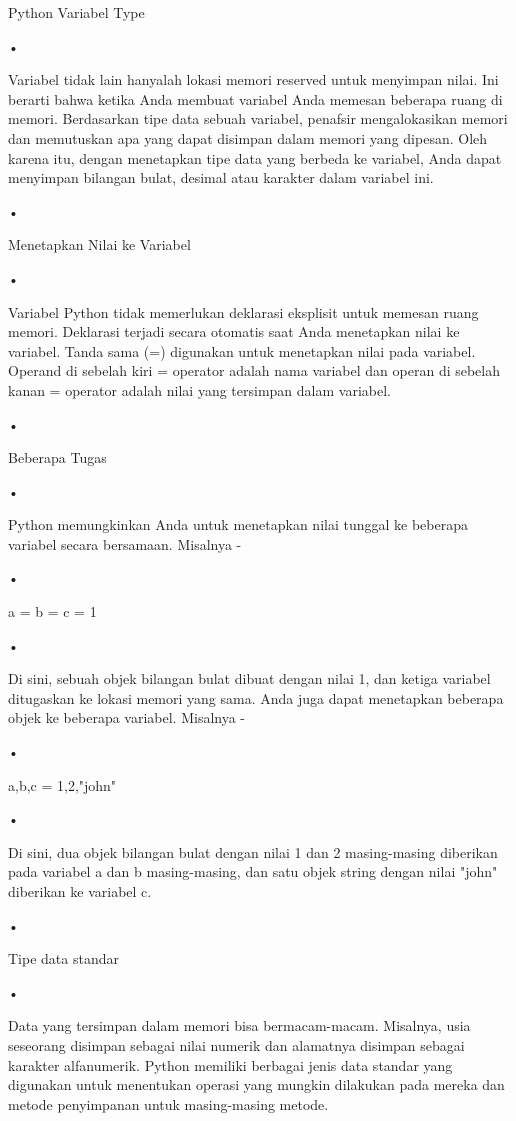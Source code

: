 Python Variabel Type 
\begin{flushleft}
•
\end{flushleft}Variabel tidak lain hanyalah lokasi memori reserved untuk menyimpan nilai. Ini berarti bahwa ketika Anda membuat variabel Anda memesan beberapa ruang di memori.
Berdasarkan tipe data sebuah variabel, penafsir mengalokasikan memori dan memutuskan apa yang dapat disimpan dalam memori yang dipesan. Oleh karena itu, dengan menetapkan tipe data yang berbeda ke variabel, Anda dapat menyimpan bilangan bulat, desimal atau karakter dalam variabel ini.

\begin{flushleft}
•
\end{flushleft}Menetapkan Nilai ke Variabel
\begin{flushleft}
•
\end{flushleft}Variabel Python tidak memerlukan deklarasi eksplisit untuk memesan ruang memori. Deklarasi terjadi secara otomatis saat Anda menetapkan nilai ke variabel. Tanda sama (=) digunakan untuk menetapkan nilai pada variabel.
Operand di sebelah kiri = operator adalah nama variabel dan operan di sebelah kanan = operator adalah nilai yang tersimpan dalam variabel.
\begin{flushleft}
•
\end{flushleft}Beberapa Tugas
\begin{flushleft}
•
\end{flushleft}Python memungkinkan Anda untuk menetapkan nilai tunggal ke beberapa variabel secara bersamaan. Misalnya -
\begin{flushleft}
•
\end{flushleft}a = b = c = 1
\begin{flushleft}
•
\end{flushleft}Di sini, sebuah objek bilangan bulat dibuat dengan nilai 1, dan ketiga variabel ditugaskan ke lokasi memori yang sama. Anda juga dapat menetapkan beberapa objek ke beberapa variabel. Misalnya -
\begin{flushleft}
•
\end{flushleft}a,b,c = 1,2,"john"
\begin{flushleft}
•
\end{flushleft}Di sini, dua objek bilangan bulat dengan nilai 1 dan 2 masing-masing diberikan pada variabel a dan b masing-masing, dan satu objek string dengan nilai "john" diberikan ke variabel c.
\begin{flushleft}
•
\end{flushleft}Tipe data standar
\begin{flushleft}
•
\end{flushleft}Data yang tersimpan dalam memori bisa bermacam-macam. Misalnya, usia seseorang disimpan sebagai nilai numerik dan alamatnya disimpan sebagai karakter alfanumerik. Python memiliki berbagai jenis data standar yang digunakan untuk menentukan operasi yang mungkin dilakukan pada mereka dan metode penyimpanan untuk masing-masing metode.

